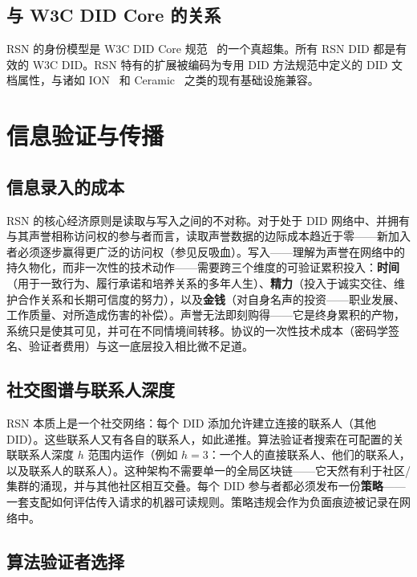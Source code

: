 \documentclass[11pt,a4paper,twocolumn]{article}
\begin{document}
\subsection{与 W3C DID Core 的关系}

RSN 的身份模型是 W3C DID Core 规范~\cite{did2022} 的一个真超集。所有 RSN DID 都是有效的 W3C DID。RSN 特有的扩展被编码为专用 DID 方法规范中定义的 DID 文档属性，与诸如 ION~\cite{buchner2021} 和 Ceramic~\cite{ceramic2023} 之类的现有基础设施兼容。

\section{信息验证与传播}

\subsection{信息录入的成本}

RSN 的核心经济原则是读取与写入之间的不对称。对于处于 DID 网络中、并拥有与其声誉相称访问权的参与者而言，读取声誉数据的边际成本趋近于零——新加入者必须逐步赢得更广泛的访问权（参见反吸血）。写入——理解为声誉在网络中的持久物化，而非一次性的技术动作——需要跨三个维度的可验证累积投入：\textbf{时间}（用于一致行为、履行承诺和培养关系的多年人生）、\textbf{精力}（投入于诚实交往、维护合作关系和长期可信度的努力），以及\textbf{金钱}（对自身名声的投资——职业发展、工作质量、对所造成伤害的补偿）。声誉无法即刻购得——它是终身累积的产物，系统只是使其可见，并可在不同情境间转移。协议的一次性技术成本（密码学签名、验证者费用）与这一底层投入相比微不足道。

\subsection{社交图谱与联系人深度}

RSN 本质上是一个社交网络：每个 DID 添加允许建立连接的联系人（其他 DID）。这些联系人又有各自的联系人，如此递推。算法验证者搜索在可配置的关联联系人深度 $h$ 范围内运作（例如 $h=3$：一个人的直接联系人、他们的联系人，以及联系人的联系人）。这种架构不需要单一的全局区块链——它天然有利于社区/集群的涌现，并与其他社区相互交叠。每个 DID 参与者都必须发布一份\textbf{策略}——一套支配如何评估传入请求的机器可读规则。策略违规会作为负面痕迹被记录在网络中。

\subsection{算法验证者选择}
\end{document}
